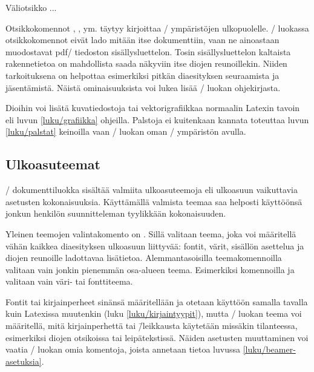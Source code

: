 \begin{koodilohkosis}
\begin{block}{Väliotsikko}
  ...
\end{block}
\end{koodilohkosis}

\noindent
Otsikkokomennot , ,
 ym. täytyy kirjoittaa \-/
ympäristöjen ulkopuolelle. \-/ luokassa otsikkokomennot
eivät lado mitään itse dokumenttiin, vaan ne ainoastaan muodostavat
pdf\-/ tiedoston sisällysluettelon. Tosin sisällysluettelon kaltaista
rakennetietoa on mahdollista saada näkyviin itse diojen reunoillekin.
Niiden tarkoituksena on helpottaa esimerkiksi pitkän diaesityksen
seuraamista ja jäsentämistä. Näistä ominaisuuksista voi lukea lisää
\-/ luokan ohjekirjasta.

Dioihin voi lisätä kuvatiedostoja tai vektorigrafiikkaa normaalin
Latexin tavoin eli luvun \ref{luku/grafiikka} ohjeilla. Palstoja ei
kuitenkaan kannata toteuttaa luvun \ref{luku/palstat} keinoilla vaan
\-/ luokan oman \-/ ympäristön avulla.

\subsection{Ulkoasuteemat}

\-/ dokumenttiluokka sisältää valmiita ulkoasuteemoja eli
ulkoasuun vaikuttavia asetusten kokonaisuuksia. Käyttämällä valmista
teemaa saa helposti käyttöönsä jonkun henkilön suunnitteleman tyylikkään
kokonaisuuden.

Yleinen teemojen valintakomento on . Sillä valitaan
teema, joka voi määritellä vähän kaikkea diaesityksen ulkoasuun
liittyvää: fontit, värit, sisällön asettelua ja diojen reunoille
ladottavaa lisätietoa. Alemmantasoisilla teemakomennoilla valitaan vain
jonkin pienemmän osa-alueen teema. Esimerkiksi komennoilla
 ja  valitaan vain väri-
tai fonttiteema.

Fontit tai kirjainperheet sinänsä määritellään ja otetaan käyttöön
samalla tavalla kuin Latexissa muutenkin (luku
\ref{luku/kirjaintyypit}), mutta \-/ luokan teema voi
määritellä, mitä kirjainperhettä tai \=/leikkausta käytetään missäkin
tilanteessa, esimerkiksi diojen otsikoissa tai leipätekstissä. Näiden
asetusten muuttaminen voi vaatia \-/ luokan omia
komentoja, joista annetaan tietoa luvussa \ref{luku/beamer-asetuksia}.


